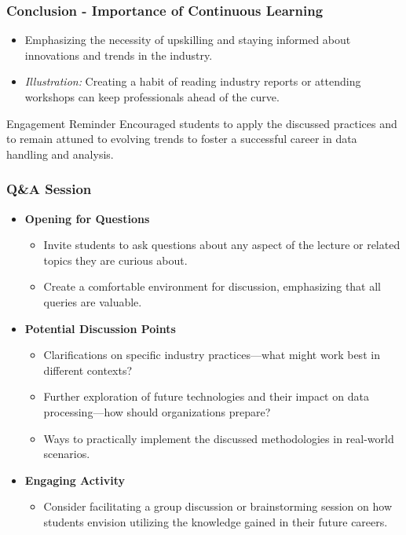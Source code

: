 \documentclass{beamer}
\begin{document}
\begin{frame}[fragile]
    \frametitle{Conclusion - Importance of Continuous Learning}
    \begin{itemize}
        \item Emphasizing the necessity of upskilling and staying informed about innovations and trends in the industry.
        \item \textit{Illustration:} Creating a habit of reading industry reports or attending workshops can keep professionals ahead of the curve.
    \end{itemize}

    \begin{block}{Engagement Reminder}
        Encouraged students to apply the discussed practices and to remain attuned to evolving trends to foster a successful career in data handling and analysis.
    \end{block}
\end{frame}

\begin{frame}[fragile]
    \frametitle{Q\&A Session}
    \begin{itemize}
        \item \textbf{Opening for Questions}
        \begin{itemize}
            \item Invite students to ask questions about any aspect of the lecture or related topics they are curious about.
            \item Create a comfortable environment for discussion, emphasizing that all queries are valuable.
        \end{itemize}

        \item \textbf{Potential Discussion Points}
        \begin{itemize}
            \item Clarifications on specific industry practices—what might work best in different contexts?
            \item Further exploration of future technologies and their impact on data processing—how should organizations prepare?
            \item Ways to practically implement the discussed methodologies in real-world scenarios.
        \end{itemize}

        \item \textbf{Engaging Activity}
        \begin{itemize}
            \item Consider facilitating a group discussion or brainstorming session on how students envision utilizing the knowledge gained in their future careers.
        \end{itemize}
    \end{itemize}
\end{frame}
\end{document}
